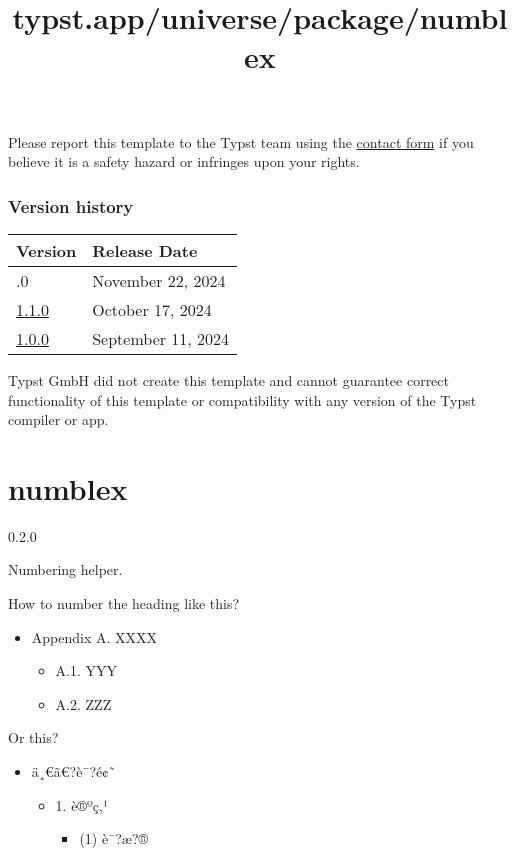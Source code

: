 Please report this template to the Typst team using the
\href{https://typst.app/contact}{contact form} if you believe it is a
safety hazard or infringes upon your rights.

\label{versions}
\subsubsection{Version history}\label{version-history}

\begin{longtable}[]{@{}ll@{}}
\toprule\noalign{}
Version & Release Date \\
\midrule\noalign{}
\endhead
\bottomrule\noalign{}
\endlastfoot
1.2.0 & November 22, 2024 \\
\href{https://typst.app/universe/package/touying-unistra-pristine/1.1.0/}{1.1.0}
& October 17, 2024 \\
\href{https://typst.app/universe/package/touying-unistra-pristine/1.0.0/}{1.0.0}
& September 11, 2024 \\
\end{longtable}

Typst GmbH did not create this template and cannot guarantee correct
functionality of this template or compatibility with any version of the
Typst compiler or app.


\title{typst.app/universe/package/numblex}

\label{banner}
\section{numblex}\label{numblex}

{ 0.2.0 }

Numbering helper.

\label{readme}
How to number the heading like this?

\begin{itemize}
\tightlist
\item
  Appendix A. XXXX

  \begin{itemize}
  \tightlist
  \item
    A.1. YYY
  \item
    A.2. ZZZ
  \end{itemize}
\end{itemize}

Or this?

\begin{itemize}
\tightlist
\item
  ä¸€ã€?è¯?é¢˜

  \begin{itemize}
  \tightlist
  \item
    1. è®ºç‚¹

    \begin{itemize}
    \tightlist
    \item
      (1) è¯?æ?®
    \end{itemize}
  \end{itemize}
\end{itemize}

